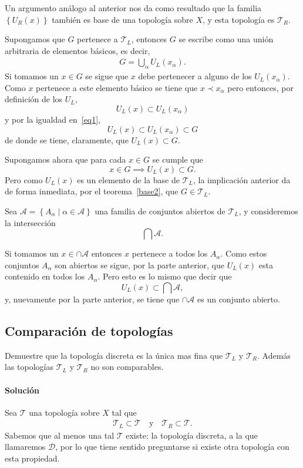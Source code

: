\documentclass[letterpaper,10pt,final]{article}
\begin{document}
Un argumento análogo al anterior nos da como resultado que la familia $\left\{ U_R(x) \right\}$ también es
base de una topología sobre $X$, y esta topología es $\mathcal{T}_R$.

Supongamos que $G$ pertenece a $\mathcal{T}_L$, entonces $G$ se escribe como una unión arbitraria
de elementos básicos, es decir, 
\begin{align}
	G = \bigcup_\alpha U_L(x_\alpha).\label{eq1}
\end{align}
Si tomamos un $x\in G$ se sigue que $x$ debe pertenecer a alguno de los $U_L(x_\alpha)$. Como $x$ pertenece
a este elemento básico se tiene que $x\prec x_\alpha$ pero entonces, por definición de los $U_L$,
\[
U_L(x)\subset U_L(x_\alpha)
\]
y por la igualdad en~\ref{eq1},
\[
U_L(x)\subset U_L(x_\alpha)\subset G
\]
de donde se tiene, claramente, que $U_L(x)\subset G$.

Supongamos ahora que para cada $x\in G$ se cumple que
\[
x\in G\implies U_L(x)\subset G.
\]
Pero como $U_L(x)$ es un elemento de la base de $\mathcal{T}_L$, la implicación anterior
da de forma inmediata, por el teorema~\ref{base2}, que $G\in\mathcal{T}_L$.

Sea $\mathcal{A}=\left\{ A_\alpha\mid\alpha\in\mathscr{A} \right\}$ una familia de conjuntos abiertos
de $\mathcal{T}_L$, y consideremos la intersección
\[
\bigcap\mathcal{A}.
\]

Si tomamos un $x\in\cap\mathcal{A}$ entonces $x$ pertenece a todos los $A_\alpha$. Como estos conjuntos
$A_\alpha$ son abiertos se sigue, por la parte anterior, que $U_L(x)$ esta contenido en todos
los $A_\alpha$. Pero esto es lo mismo que decir que
\[
U_L(x)\subset\bigcap\mathcal{A},
\]
y, nuevamente por la parte anterior, se tiene que $\cap\mathcal{A}$ es un conjunto abierto.

\subsection{Comparación de topologías}
Demuestre que la topología discreta es la única mas fina que $\mathcal{T}_L$ y $\mathcal{T}_R$. Además las topologías $\mathcal{T}_L$ y $\mathcal{T}_R$ no son comparables.

\paragraph{Solución}
Sea $\mathcal{T}$ una topología sobre $X$ tal que
\begin{align}\label{eq2}
	\mathcal{T}_L\subset\mathcal{T}\quad\text{y}\quad\mathcal{T}_R\subset\mathcal{T}.
\end{align}
Sabemos que al menos una tal $\mathcal{T}$ existe: la topología discreta, a la que llamaremos $\mathcal{D}$, por lo que
tiene sentido preguntarse si existe otra topología con esta propiedad.
\end{document}
